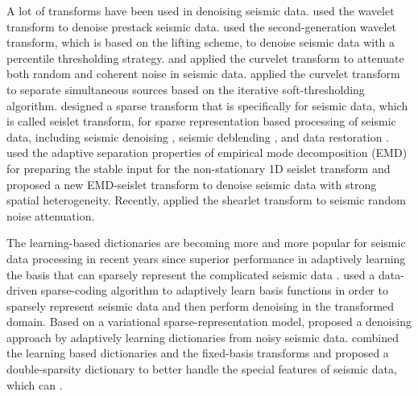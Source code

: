 A lot of transforms have been used in denoising seismic data. \cite{jinghuai2006} used the wavelet transform to denoise prestack seismic data. \cite{dian2008} used the second-generation wavelet transform, which is based on the lifting scheme, to denoise seismic data with a percentile thresholding strategy. \cite{hennenfent2006} and \cite{neelamani2008}  applied the curvelet transform to attenuate both random and coherent noise in seismic data. \cite{shaohuan2016} applied the curvelet transform to separate simultaneous sources based on the iterative soft-thresholding algorithm. \cite{fomel2010seislet} designed a sparse transform that is  specifically for seismic data, which is called seislet transform, for sparse representation based processing of seismic data, including seismic denoising \cite[]{yangkang2016emd,wujiandemul2016}, seismic deblending \cite[]{yangkang20142,shuwei20163},  and data restoration \cite[]{shuwei20153,shuwei20164,liuwei2016dealiase}. \cite{emdseis} used the adaptive separation properties of empirical mode decomposition (EMD) \cite[]{huangemd} for preparing the stable input for the non-stationary 1D seislet transform and proposed a new EMD-seislet transform to denoise seismic data with strong spatial heterogeneity. Recently, \cite{dehui2015} applied the shearlet transform to seismic random noise attenuation. 

The learning-based dictionaries are becoming more and more popular for seismic data processing in recent years since  superior performance in adaptively learning the basis that can sparsely represent the complicated seismic data  \cite[]{sgk2013}. \cite{kaplan2009} used a data-driven sparse-coding algorithm to adaptively learn basis functions in order to sparsely represent seismic data and then perform denoising in the transformed domain. Based on a variational sparse-representation model, \cite{jianwei20142} proposed a denoising approach by adaptively learning dictionaries from noisy seismic data. \cite{yangkang2016dsd} combined the learning based dictionaries and the fixed-basis transforms and proposed a double-sparsity dictionary to better handle the special features of seismic data, which can .  

